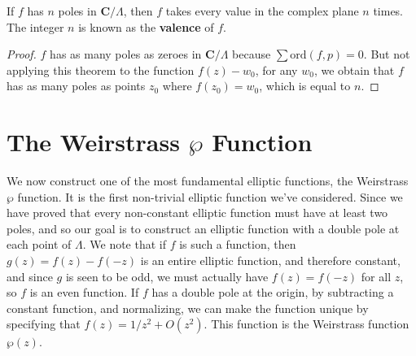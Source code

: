 \begin{corollary}
    If $f$ has $n$ poles in $\mathbf{C}/\Lambda$, then $f$ takes every value in the complex plane $n$ times. The integer $n$ is known as the {\bf valence} of $f$.
\end{corollary}
\begin{proof}
    $f$ has as many poles as zeroes in $\mathbf{C}/\Lambda$ because $\sum \text{ord}(f,p) = 0$. But not applying this theorem to the function $f(z) - w_0$, for any $w_0$, we obtain that $f$ has as many poles as points $z_0$ where $f(z_0) = w_0$, which is equal to $n$.
\end{proof}

\section{The Weirstrass $\wp$ Function}

We now construct one of the most fundamental elliptic functions, the Weirstrass $\wp$ function. It is the first non-trivial elliptic function we've considered. Since we have proved that every non-constant elliptic function must have at least two poles, and so our goal is to construct an elliptic function with a double pole at each point of $\Lambda$. We note that if $f$ is such a function, then $g(z) = f(z) - f(-z)$ is an entire elliptic function, and therefore constant, and since $g$ is seen to be odd, we must actually have $f(z) = f(-z)$ for all $z$, so $f$ is an even function. If $f$ has a double pole at the origin, by subtracting a constant function, and normalizing, we can make the function unique by specifying that $f(z) = 1/z^2 + O(z^2)$. This function is the Weirstrass function $\wp(z)$.

